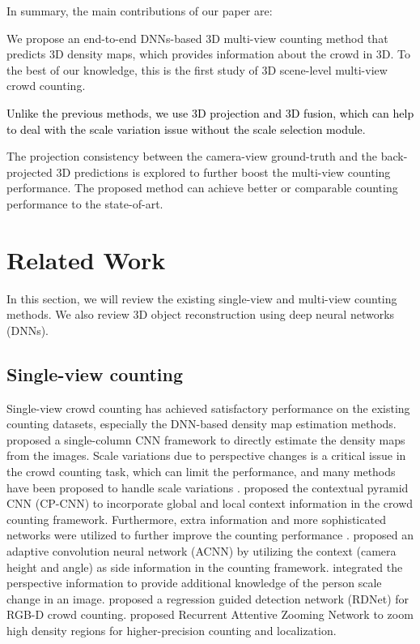 \documentclass[letterpaper]{article}
\newcommand{\zq}[1]{\textcolor{black}{#1}} %
\newcommand{\citep}{\cite}
\newcommand{\citealp}[1]{\citeauthor{#1} \citeyear{#1}}
\begin{document}
In summary, the main contributions of our paper are:
\begin{compactitem}
  \item We propose an end-to-end DNNs-based 3D multi-view counting method that predicts 3D density maps, which provides information about the crowd in 3D. To the best of our knowledge, this is the first study of 3D scene-level multi-view crowd counting.
  \item \zq{Unlike the previous methods, we use 3D projection and 3D fusion, which can help to deal with the scale variation issue without the scale selection module}.
  \item The projection consistency between the camera-view ground-truth and the back-projected 3D predictions is explored to further boost the multi-view counting performance. The proposed method can achieve better or comparable counting performance to the state-of-art.
\end{compactitem}


\section{Related Work}
In this section, we will review the existing single-view and multi-view counting methods. We also review 3D object reconstruction using deep neural networks (DNNs).

\subsection{Single-view counting}
Single-view crowd counting has achieved satisfactory performance on the existing counting datasets, especially the DNN-based density map estimation methods. \citealp{zhang2015cross} proposed a single-column CNN framework to directly estimate the density maps from the images. Scale variations due to perspective changes %
 is a critical issue in the crowd counting task, which can limit the performance, and many %
 methods have been proposed to handle scale variations \citep{boominathan2016crowdnet,zhang2016single,sam2017switching,Kang2018Crowd,onoro2016towards}.
 \citealp{sindagi2017generating} proposed the contextual pyramid CNN (CP-CNN) to incorporate global and local context information in the crowd counting framework. Furthermore, extra information and more sophisticated networks were utilized to further improve the counting performance \citep{idrees2018composition,Wang2019Learning,ranjan2018iterative,cao2018scale,li2018csrnet,liu2018decidenet,shen2018crowd,Jiang2019Crowd,Liu2019Context}.
 \citealp{kang2017incorporating} proposed an adaptive convolution neural network (ACNN) by utilizing the context (camera height and angle) as side information in the counting framework.
 \citealp{shi2019revisiting} integrated the perspective information to provide additional knowledge of the person scale change in an image.
 \citealp{Lian2019Density} proposed a regression guided detection network (RDNet) for RGB-D crowd counting.
 \citealp{Liu2019Recurrent} proposed Recurrent Attentive Zooming Network to zoom high density regions for higher-precision counting and localization.
\end{document}
